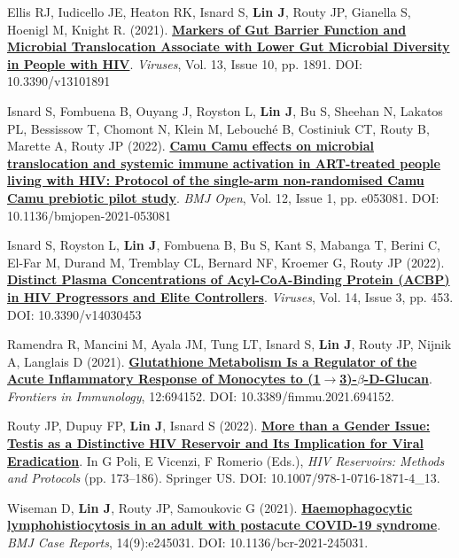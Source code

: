 \documentclass[letterpaper,11pt]{article}
\newcounter{journalCounter}
\newcommand{\jref}{%
    \stepcounter{journalCounter}%
    \textbf{[J.\thejournalCounter]}%
}
\begin{document}
\item[\jref] Ellis RJ, Iudicello JE, Heaton RK, Isnard S, \textbf{Lin J}, Routy JP, Gianella S, Hoenigl M, Knight R. (2021). \href{https://doi.org/10.3390/v13101891}{\textbf{Markers of Gut Barrier Function and Microbial Translocation Associate with Lower Gut Microbial Diversity in People with HIV}}. \textit{Viruses}, Vol. 13, Issue 10, pp. 1891. DOI: 10.3390/v13101891

\item[\jref] Isnard S, Fombuena B, Ouyang J, Royston L, \textbf{Lin J}, Bu S, Sheehan N, Lakatos PL, Bessissow T, Chomont N, Klein M, Lebouché B, Costiniuk CT, Routy B, Marette A, Routy JP (2022). \href{https://doi.org/10.1136/bmjopen-2021-053081}{\textbf{Camu Camu effects on microbial translocation and systemic immune activation in ART-treated people living with HIV: Protocol of the single-arm non-randomised Camu Camu prebiotic pilot study}}. \textit{BMJ Open}, Vol. 12, Issue 1, pp. e053081. DOI: 10.1136/bmjopen-2021-053081

\item[\jref] Isnard S, Royston L, \textbf{Lin J}, Fombuena B, Bu S, Kant S, Mabanga T, Berini C, El-Far M, Durand M, Tremblay CL, Bernard NF, Kroemer G, Routy JP (2022). \href{https://doi.org/10.3390/v14030453}{\textbf{Distinct Plasma Concentrations of Acyl-CoA-Binding Protein (ACBP) in HIV Progressors and Elite Controllers}}. \textit{Viruses}, Vol. 14, Issue 3, pp. 453. DOI: 10.3390/v14030453

\item[\jref] Ramendra R, Mancini M, Ayala JM, Tung LT, Isnard S, \textbf{Lin J}, Routy JP, Nijnik A, Langlais D (2021). \href{https://doi.org/10.3389/fimmu.2021.694152}{\textbf{Glutathione Metabolism Is a Regulator of the Acute Inflammatory Response of Monocytes to (1$\rightarrow$3)-$\beta$-D-Glucan}}. \textit{Frontiers in Immunology}, 12:694152. DOI: 10.3389/fimmu.2021.694152.

\item[\jref] Routy JP, Dupuy FP, \textbf{Lin J}, Isnard S (2022). \href{https://doi.org/10.1007/978-1-0716-1871-4_13}{\textbf{More than a Gender Issue: Testis as a Distinctive HIV Reservoir and Its Implication for Viral Eradication}}. In G Poli, E Vicenzi, F Romerio (Eds.), \textit{HIV Reservoirs: Methods and Protocols} (pp. 173–186). Springer US. DOI: 10.1007/978-1-0716-1871-4\_13.

\item[\jref] Wiseman D, \textbf{Lin J}, Routy JP, Samoukovic G (2021). \href{https://doi.org/10.1136/bcr-2021-245031}{\textbf{Haemophagocytic lymphohistiocytosis in an adult with postacute COVID-19 syndrome}}. \textit{BMJ Case Reports}, 14(9):e245031. DOI: 10.1136/bcr-2021-245031.
\end{document}
